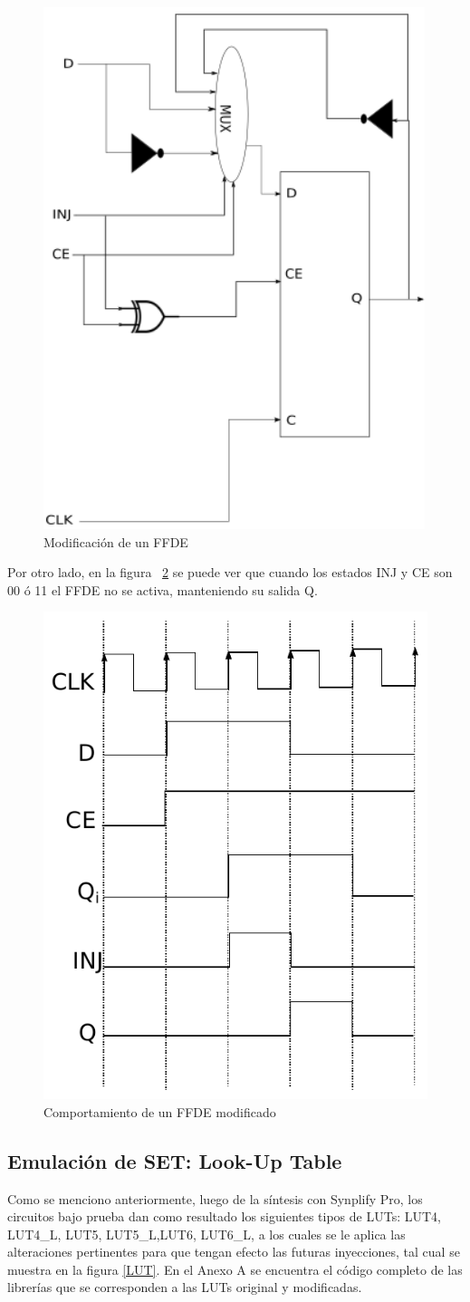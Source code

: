 \documentclass[a4paper,openright,12pt]{report}
\begin{document}
\begin{figure}[H]
	\centering
	\includegraphics[width=0.5 \textwidth]{img/FFDE.png}
	\caption{Modificación de un FFDE }
	\label{FFDE}
\end{figure}

Por otro lado, en la figura ~\ref{FFDESS}  se puede ver que cuando los estados INJ  y CE son 00 ó 11 el FFDE  no se activa, manteniendo su salida Q.

\begin{figure}[H]
	\centering
	\includegraphics[width=0.4 \textwidth]{img/FFDES.pdf}
	\caption{Comportamiento de un FFDE  modificado }
	\label{FFDESS}
\end{figure}


\subsection{Emulación de SET: Look-Up Table }

Como se menciono anteriormente, luego  de la síntesis con  Synplify Pro, los circuitos  bajo prueba dan como resultado los siguientes tipos de LUTs: LUT4, LUT4\_L, LUT5, LUT5\_L,LUT6, LUT6\_L, a los cuales se le aplica las alteraciones pertinentes para que tengan efecto las futuras inyecciones, tal cual se muestra en la figura \ref{LUT}. En el Anexo A se encuentra el código completo de las librerías que se corresponden a las LUTs original y modificadas.
\end{document}
